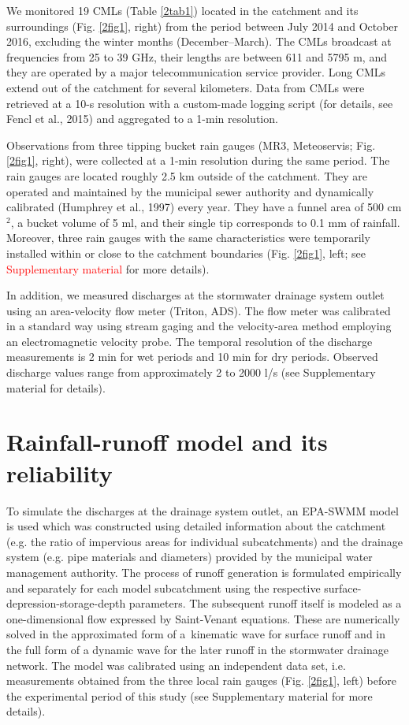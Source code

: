 \documentclass{ctuthesis}\usepackage[]{graphicx}\usepackage[]{color}
\begin{document}
We monitored 19 CMLs (Table \ref{2tab1}) located in the catchment and its surroundings (Fig. \ref{2fig1}, right) from the period between July 2014 and October 2016, excluding the winter months (December--March). The CMLs broadcast at frequencies from 25 to 39 GHz, their lengths are between 611 and 5795 m, and they are operated by a major telecommunication service provider. Long CMLs extend out of the catchment for several kilometers. Data from CMLs were retrieved at a 10-s resolution with a custom-made logging script (for details, see Fencl et al., 2015) and aggregated to a 1-min resolution.

Observations from three tipping bucket rain gauges (MR3, Meteoservis; Fig. \ref{2fig1}, right), were collected at a 1-min resolution during the same period. The rain gauges are located roughly 2.5 km outside of the catchment. They are operated and maintained by the municipal sewer authority and dynamically calibrated (Humphrey et al., 1997) every year. They have a funnel area of 500 cm$^2$, a bucket volume of 5 ml, and their single tip corresponds to 0.1 mm of rainfall. Moreover, three rain gauges with the same characteristics were temporarily installed within or close to the catchment boundaries (Fig. \ref{2fig1}, left; see \textcolor{red}{Supplementary material} for more details).

In addition, we measured discharges at the stormwater drainage system outlet using an area-velocity flow meter (Triton, ADS). The flow meter was calibrated in a standard way using stream gaging and the velocity-area method employing an electromagnetic velocity probe. The temporal resolution of the discharge measurements is 2 min for wet periods and 10 min for dry periods. Observed discharge values range from approximately 2 to 2000 l/s (see Supplementary material for details).


\section{Rainfall-runoff model and its reliability} \label{RRmodel}

To simulate the discharges at the drainage system outlet, an EPA-SWMM model is used which was constructed using detailed information about the catchment (e.g. the ratio of impervious areas for individual subcatchments) and the drainage system (e.g. pipe materials and diameters) provided by the municipal water management authority. The process of runoff generation is formulated empirically and separately for each model subcatchment using the respective surface-depression-storage-depth parameters. The subsequent runoff itself is modeled as a one-dimensional flow expressed by Saint-Venant equations. These are numerically solved in the approximated form of a~kinematic wave for surface runoff and in the full form of a dynamic wave for the later runoff in the stormwater drainage network. The model was calibrated using an independent data set, i.e. measurements obtained from the three local rain gauges (Fig. \ref{2fig1}, left) before the experimental period of this study (see Supplementary material for more details). 
\end{document}

